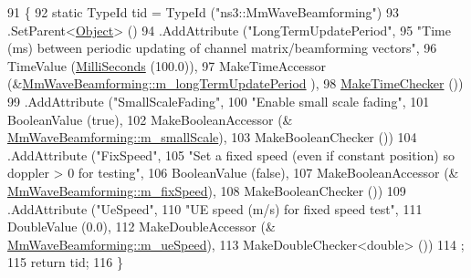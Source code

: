 \begin{DoxyCode}
91 \{
92         \textcolor{keyword}{static} TypeId tid = TypeId (\textcolor{stringliteral}{"ns3::MmWaveBeamforming"})
93                 .SetParent<\hyperlink{classns3_1_1Object_a40860402e64d8008fb42329df7097cdb}{Object}> ()
94                 .AddAttribute (\textcolor{stringliteral}{"LongTermUpdatePeriod"},
95                                    \textcolor{stringliteral}{"Time (ms) between periodic updating of channel matrix/beamforming
       vectors"},
96            TimeValue (\hyperlink{group__timecivil_gaf26127cf4571146b83a92ee18679c7a9}{MilliSeconds} (100.0)),
97            MakeTimeAccessor (&\hyperlink{classns3_1_1MmWaveBeamforming_acdc1c52dae96b7e5b73a235f381e39f0}{MmWaveBeamforming::m\_longTermUpdatePeriod}
      ),
98            \hyperlink{group__time_ga7032965bd4afa578691d88c09e4481c1}{MakeTimeChecker} ())
99          .AddAttribute (\textcolor{stringliteral}{"SmallScaleFading"},
100                                                                         \textcolor{stringliteral}{"Enable small scale fading"},
101                                                                         BooleanValue (\textcolor{keyword}{true}),
102                                                                         MakeBooleanAccessor (&
      \hyperlink{classns3_1_1MmWaveBeamforming_a08a07e3ded70f591331ecb9f88482220}{MmWaveBeamforming::m\_smallScale}),
103                                                                         MakeBooleanChecker ())
104          .AddAttribute (\textcolor{stringliteral}{"FixSpeed"},
105                                                                         \textcolor{stringliteral}{"Set a fixed speed (even if
       constant position) so doppler > 0 for testing"},
106                                                                         BooleanValue (\textcolor{keyword}{false}),
107                                                                         MakeBooleanAccessor (&
      \hyperlink{classns3_1_1MmWaveBeamforming_aa083011423cd8a3c1077725af8bb7de0}{MmWaveBeamforming::m\_fixSpeed}),
108                                                                         MakeBooleanChecker ())
109          .AddAttribute (\textcolor{stringliteral}{"UeSpeed"},
110                                                                         \textcolor{stringliteral}{"UE speed (m/s) for fixed speed
       test"},
111                                                                         DoubleValue (0.0),
112                                                                         MakeDoubleAccessor (&
      \hyperlink{classns3_1_1MmWaveBeamforming_a11796c9c9b2df2d24fe99e7e5817cd20}{MmWaveBeamforming::m\_ueSpeed}),
113                                                                         MakeDoubleChecker<double> ())
114         ;
115         \textcolor{keywordflow}{return} tid;
116 \}
\end{DoxyCode}


